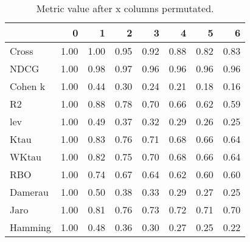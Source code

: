 \begin{table}[h]
\centering
\caption{Metric value after x columns permutated.}
\label{tab:data}
\begin{tabular}{l|r|r|r|r|r|r|r|}
\toprule
 & 0 & 1 & 2 & 3 & 4 & 5 & 6 \\
\midrule
Cross & 1.00 & 1.00 & 0.95 & 0.92 & 0.88 & 0.82 & 0.83 \\
NDCG & 1.00 & 0.98 & 0.97 & 0.96 & 0.96 & 0.96 & 0.96 \\
Cohen k & 1.00 & 0.44 & 0.30 & 0.24 & 0.21 & 0.18 & 0.16 \\
R2 & 1.00 & 0.88 & 0.78 & 0.70 & 0.66 & 0.62 & 0.59 \\
lev & 1.00 & 0.49 & 0.37 & 0.32 & 0.29 & 0.26 & 0.25 \\
Ktau & 1.00 & 0.83 & 0.76 & 0.71 & 0.68 & 0.66 & 0.64 \\
WKtau & 1.00 & 0.82 & 0.75 & 0.70 & 0.68 & 0.66 & 0.64 \\
RBO & 1.00 & 0.74 & 0.67 & 0.64 & 0.62 & 0.60 & 0.60 \\
Damerau & 1.00 & 0.50 & 0.38 & 0.33 & 0.29 & 0.27 & 0.25 \\
Jaro & 1.00 & 0.81 & 0.76 & 0.73 & 0.72 & 0.71 & 0.70 \\
Hamming & 1.00 & 0.48 & 0.36 & 0.30 & 0.27 & 0.25 & 0.22 \\
\bottomrule
\end{tabular}
\end{table}
